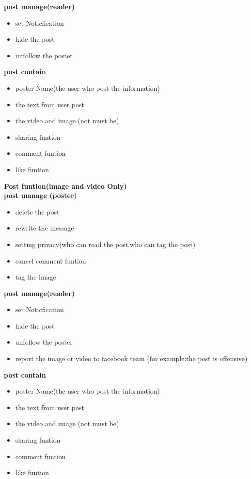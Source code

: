 \textbf{post manage(reader)}
\begin{itemize}
\item set Noticfication
\item hide the post 
\item unfollow the poster
\end{itemize}

\textbf{post contain}
\begin{itemize}
\item poster Name(the user who post the information)
\item the text from user post
\item the video and image (not must be)
\item sharing funtion
\item comment funtion
\item like funtion
\end{itemize}


\textbf{Post funtion(image and video Only)}\\

\textbf{post manage (poster)}
\begin{itemize}
\item delete the post
\item rewrite the message
\item setting privacy(who can read the post,who can tag the post)
\item cancel comment funtion
\item tag the image 
\end{itemize}

\textbf{post manage(reader)}
\begin{itemize}
\item set Noticfication
\item hide the post 
\item unfollow the poster
\item report the image or video to facebook team (for example:the post is
      offensive)
\end{itemize}

\textbf{post contain}
\begin{itemize}
\item poster Name(the user who post the information)
\item the text from user post
\item the video and image (not must be)
\item sharing funtion
\item comment funtion
\item like funtion
\end{itemize}


